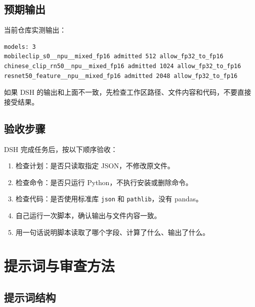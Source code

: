 \subsection{预期输出}\label{ux9884ux671fux8f93ux51fa}

当前仓库实测输出：

\begin{lstlisting}
models: 3
mobileclip_s0__npu__mixed_fp16 admitted 512 allow_fp32_to_fp16
chinese_clip_rn50__npu__mixed_fp16 admitted 1024 allow_fp32_to_fp16
resnet50_feature__npu__mixed_fp16 admitted 2048 allow_fp32_to_fp16
\end{lstlisting}

如果 DSH
的输出和上面不一致，先检查工作区路径、文件内容和代码，不要直接接受结果。

\subsection{验收步骤}\label{ux9a8cux6536ux6b65ux9aa4}

DSH 完成任务后，按以下顺序验收：

\begin{enumerate}
\def\labelenumi{\arabic{enumi}.}
\tightlist
\item
  检查计划：是否只读取指定 JSON，不修改原文件。
\item
  检查命令：是否只运行 Python，不执行安装或删除命令。
\item
  检查代码：是否使用标准库 \passthrough{\lstinline!json!} 和
  \passthrough{\lstinline!pathlib!}，没有 pandas。
\item
  自己运行一次脚本，确认输出与文件内容一致。
\item
  用一句话说明脚本读取了哪个字段、计算了什么、输出了什么。
\end{enumerate}

\section{提示词与审查方法}\label{ux63d0ux793aux8bcdux4e0eux5ba1ux67e5ux65b9ux6cd5}

\subsection{提示词结构}\label{ux63d0ux793aux8bcdux7ed3ux6784}

